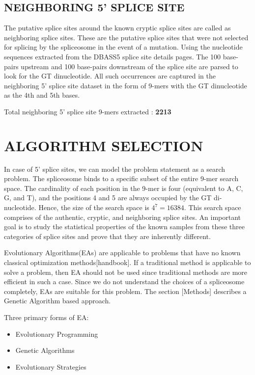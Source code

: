 \documentclass[12pt,a4paper]{article}
\begin{document}
	\subsection{NEIGHBORING 5' SPLICE SITE}
	The putative splice sites around the known cryptic splice sites are called as neighboring splice sites. These are the putative splice sites that were not selected for splicing by the spliceosome in the event of a mutation. Using the nucleotide sequences extracted from the DBASS5 splice site details pages. The 100 base-pairs upstream and 100 base-pairs downstream of the splice site are parsed to look for the GT dinucleotide. All such occurrences are captured in the neighboring 5’ splice site dataset in the form of 9-mers with the GT dinucleotide as the 4th and 5th bases.\par
	
	Total neighboring 5’ splice site 9-mers extracted : \textbf{2213}
	
	\section{ALGORITHM SELECTION}
	In case of 5’ splice sites, we can model the problem statement as a search problem. The spliceosome binds to a specific subset of the entire 9-mer search space. The cardinality of each position in the 9-mer is four (equivalent to A, C, G, and T), and the positions 4 and 5 are always occupied by the GT di-nucleotide. Hence, the size of the search space is $ 4^{7} = 16384 $. This search space comprises of the authentic, cryptic, and neighboring splice sites. An important goal is to study the statistical properties of the known samples from these three categories of splice sites and prove that they are inherently different. \par
	Evolutionary Algorithms(EAs) are applicable to problems that have no known classical optimization methods[handbook]. If a traditional method is applicable to solve a problem, then EA should not be used since traditional methods are more efficient in such a case. Since we do not understand the choices of a spliceosome completely, EAs are suitable for this problem. The section [Methods] describes a Genetic Algorithm based approach.\par
	Three primary forms of EA:
	\begin{itemize}
	\item Evolutionary Programming
	\item Genetic Algorithms
	\item Evolutionary Strategies
	\end{itemize}
	
\end{document}

